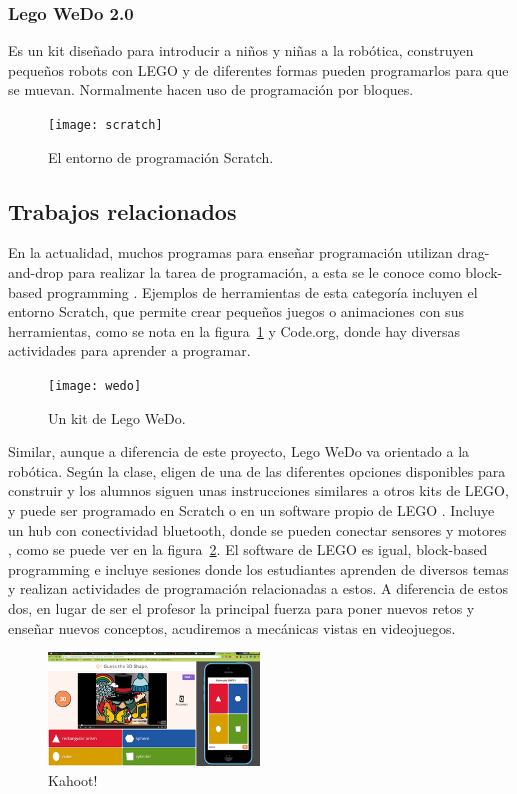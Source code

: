 \subsubsection{Lego WeDo 2.0}
Es un kit diseñado para introducir a niños y niñas a la robótica, 
construyen pequeños robots con LEGO y de diferentes 
formas pueden programarlos para que se muevan. 
Normalmente hacen uso de programación por bloques.

\begin{figure}[ht]
    \centering
    \texttt{[image: scratch]}
    \caption{El entorno de programación Scratch.}
    \label{fig:scratch_scrn}
\end{figure}

\subsection{Trabajos relacionados}
En la actualidad, muchos programas para enseñar programación utilizan 
drag-and-drop para realizar la tarea de programación, 
a esta se le conoce como block-based programming \cite{block_based_programming}. 
Ejemplos de herramientas de esta categoría incluyen el entorno Scratch, 
que permite crear pequeños juegos o animaciones con sus herramientas, 
como se nota en la figura~\ref{fig:scratch_scrn} y Code.org, donde hay diversas actividades 
para aprender a programar.

\begin{figure}[ht]
    \centering
    \texttt{[image: wedo]}
    \caption{Un kit de Lego WeDo.}
    \label{fig:wedo_kit}
\end{figure}

Similar, aunque a diferencia de este proyecto, Lego WeDo va orientado a la robótica. Según la clase, eligen de una de las diferentes opciones disponibles para construir y los alumnos siguen unas instrucciones similares a otros kits de LEGO, y puede ser programado en Scratch o en un software propio de LEGO \cite{lego_wedo_explanation}. Incluye un hub con conectividad bluetooth, donde se pueden conectar sensores y motores \cite{lego_wedo_site}, como se puede ver en la figura~\ref{fig:wedo_kit}. El software de LEGO es igual, block-based programming e incluye sesiones donde los estudiantes aprenden de diversos temas y realizan actividades de programación relacionadas a estos. A diferencia de estos dos, en lugar de ser el profesor la principal fuerza para poner nuevos retos y enseñar nuevos conceptos, acudiremos a mecánicas vistas en videojuegos.

\begin{figure}[ht]
    \centering
    \includegraphics[width=0.5\textwidth]{images/kahoot.png}
    \caption{Kahoot!}
    \label{fig:kahoot}
\end{figure}

